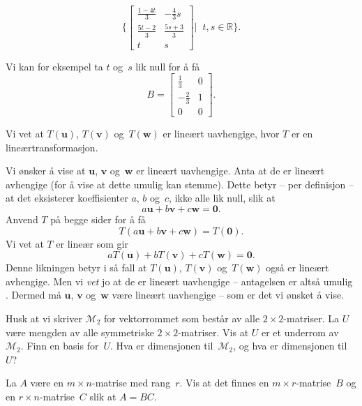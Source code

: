 \documentclass[titlepage,a4paper,12pt,norsk]{IMFeksamen}
\newcommand{\M}{\mathcal{M}} %
\newcommand{\V}[1]{\mathbf{#1}}
\renewcommand{\u}{\V{u}}
\renewcommand{\v}{\V{v}}
\newcommand{\w}{\V{w}}
\newcommand{\0}{\V{0}}
\begin{document}
\begin{oppgave}
\[\{\begin{bmatrix}
\frac{1-4t}{3} & -\frac{4}{3}s\\
\frac{5t-2}{3} & \frac{5s+3}{3}\\
t & s
\end{bmatrix}|\;\;t,s\in\mathbb{R}\}.
\]

Vi kan for eksempel ta $t$ og~$s$ lik null for å få
\[
B=
\begin{bmatrix}
\frac{1}{3} & 0\\
-\frac{2}{3} & 1\\
0 & 0
\end{bmatrix}.
\]
\end{oppgave}


\begin{oppgave}
Vi vet at $T(\u)$, $T(\v)$ og~$T(\w)$ er lineært uavhengige, hvor $T$ er en lineærtransformasjon. 

Vi ønsker å vise at $\u$, $\v$ og~$\w$ er lineært uavhengige. Anta at de er lineært avhengige (for å vise at dette umulig kan stemme). Dette betyr -- per definisjon -- at det eksisterer koeffisienter $a$, $b$ og~$c$, ikke alle lik null, slik at
\[
a\u+b\v+c\w=\0. 
\]
Anvend $T$ på begge sider for å få 
\[
T(a\u+b\v+c\w)=T(\0). 
\]
Vi vet at $T$ er lineær som gir
\[
aT(\u)+bT(\v)+cT(\w)=\0. 
\]
Denne likningen betyr i så fall at $T(\u)$, $T(\v)$ og~$T(\w)$ også er lineært avhengige. Men vi \emph{vet} jo at de er lineært uavhengige -- antagelsen er altså umulig . Dermed må $\u$, $\v$ og~$\w$ være lineært uavhengige -- som er det vi ønsket å vise.
\end{oppgave}
\begin{oppgave}
Husk at vi skriver $\M_2$ for vektorrommet som består av alle $2 \times 2$-matriser.
La $U$ være mengden av alle symmetriske $2 \times 2$-matriser.
Vis at $U$ er et underrom av~$\M_2$.
Finn en basis for~$U$.  Hva er dimensjonen til~$\M_2$, og hva er dimensjonen til~$U$?
\end{oppgave}


\begin{oppgave}
La $A$ være en $m \times n$-matrise med rang~$r$.
Vis at det finnes en $m \times r$-matrise~$B$ og
en $r \times n$-matrise~$C$
slik at $A = BC$.
\end{oppgave}
\end{document}
